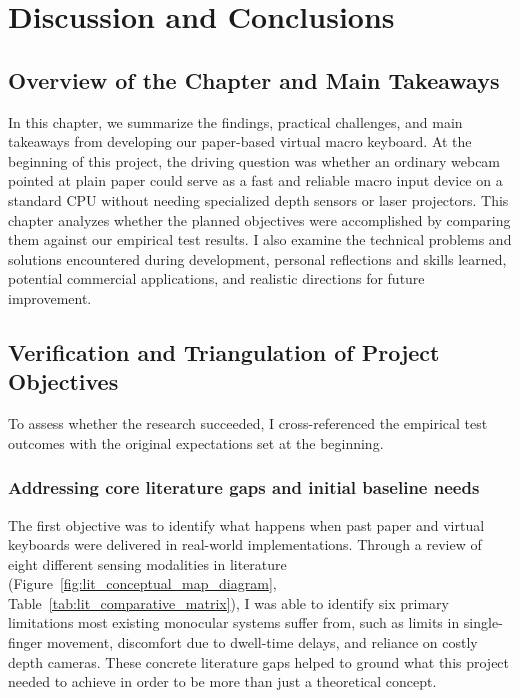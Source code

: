 \chapter{Discussion and Conclusions}
\label{ch:discussion_conclusions}

\section{Overview of the Chapter and Main Takeaways}
\label{sec:concl_overview}
In this chapter, we summarize the findings, practical challenges, and main takeaways from developing our paper-based virtual macro keyboard. At the beginning of this project, the driving question was whether an ordinary webcam pointed at plain paper could serve as a fast and reliable macro input device on a standard CPU without needing specialized depth sensors or laser projectors. This chapter analyzes whether the planned objectives were accomplished by comparing them against our empirical test results. I also examine the technical problems and solutions encountered during development, personal reflections and skills learned, potential commercial applications, and realistic directions for future improvement.

\section{Verification and Triangulation of Project Objectives}
\label{sec:concl_objectives}
To assess whether the research succeeded, I cross-referenced the empirical test outcomes with the original expectations set at the beginning.

\subsection{Addressing core literature gaps and initial baseline needs}
\label{subsec:concl_obj1}
The first objective was to identify what happens when past paper and virtual keyboards were delivered in real-world implementations. Through a review of eight different sensing modalities in literature (Figure~\ref{fig:lit_conceptual_map_diagram}, Table~\ref{tab:lit_comparative_matrix}), I was able to identify six primary limitations most existing monocular systems suffer from, such as limits in single-finger movement, discomfort due to dwell-time delays, and reliance on costly depth cameras. These concrete literature gaps helped to ground what this project needed to achieve in order to be more than just a theoretical concept.

